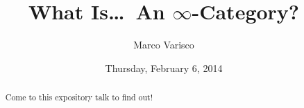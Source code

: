 \documentclass{UAmathtalk}
\author{Marco Varisco}
\title{What Is\ldots\ An \texorpdfstring{$\infty$}{Infinity}-Category?}
\date{Thursday, February 6, 2014}
\begin{document}
\maketitle

\begin{abstract}
Come to this expository talk to find out!
\end{abstract}
\end{document}
